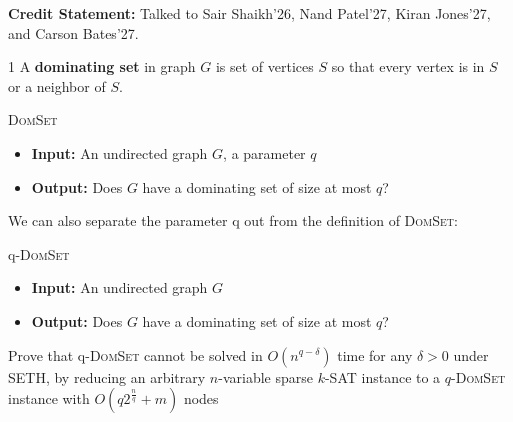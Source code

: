 \documentclass[12pt]{article}
\begin{document}


\textbf{Credit Statement:} Talked to Sair Shaikh'26, Nand Patel'27, Kiran Jones'27, and Carson Bates'27. 

\begin{problem}{1}
    A \textbf{dominating set} in graph $G$ is set of vertices $S$ so that every vertex is in $S$ or a neighbor of $S$.
    \begin{tcolorbox}
        \textsc{DomSet}
        \begin{itemize}
            \item \textbf{Input:} An undirected graph $G$, a parameter $q$
            \item \textbf{Output:} Does $G$ have a dominating set of size at most $q$?
        \end{itemize}
    \end{tcolorbox}

    We can also separate the parameter q out from the definition of \textsc{DomSet}:
    \begin{tcolorbox}
        q-\textsc{DomSet}
        \begin{itemize}
            \item \textbf{Input:} An undirected graph $G$
            \item \textbf{Output:} Does $G$ have a dominating set of size at most $q$?
            \end{itemize}
    \end{tcolorbox}
    Prove that q-\textsc{DomSet} cannot be solved in $O(n^{q-\delta})$ time for any $\delta > 0$ under SETH, by reducing an arbitrary $n$-variable sparse $k$-SAT instance to a $q$-\textsc{DomSet} instance with $O(q2^{\frac{n}{q}}+m)$ nodes
\end{problem}
\end{document}
